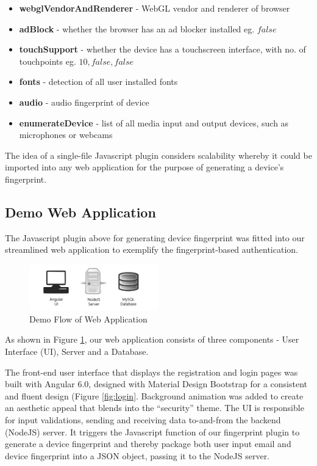 \documentclass{acm_proc_article-sp}
\begin{document}
\begin{itemize}
    \item\textbf{ webglVendorAndRenderer} - WebGL vendor and renderer of browser
    \item\textbf{ adBlock} - whether the browser has an ad blocker installed eg. $false$
    \item\textbf{ touchSupport} - whether the device has a touchscreen interface, with no. of touchpoints eg. $10, false,false$
    \item\textbf{ fonts} - detection of all user installed fonts
    \item\textbf{ audio} - audio fingerprint of device
    \item\textbf{ enumerateDevice} -  list of all media input and output devices, such as microphones or webcams

\end{itemize}



The idea of a single-file Javascript plugin considers scalability whereby it could be imported into any web application for the purpose of generating a device’s fingerprint.

\subsection{Demo Web Application}
The Javascript plugin above for generating device fingerprint was fitted into our streamlined web application to exemplify the fingerprint-based authentication.

\begin{figure}[h]
    \centering
    \includegraphics[width=0.5\textwidth]{assets/fig3-demo-flow.png}
    \caption{Demo Flow of Web Application}
    \label{fig:demo-flow}
\end{figure}

As shown in Figure \ref{fig:demo-flow}, our web application consists of three components - User Interface (UI), Server and a Database.

The front-end user interface that displays the registration and login pages was built with Angular 6.0, designed with Material Design Bootstrap for a consistent and fluent design (Figure \ref{fig:login}. Background animation was added to create an aesthetic appeal that blends into the “security” theme. The UI is responsible for input validations, sending and receiving data to-and-from the backend (NodeJS) server. It triggers the Javascript function of our fingerprint plugin to generate a device fingerprint and thereby package both user input email and device fingerprint into a JSON object, passing it to the NodeJS server.
\end{document}
